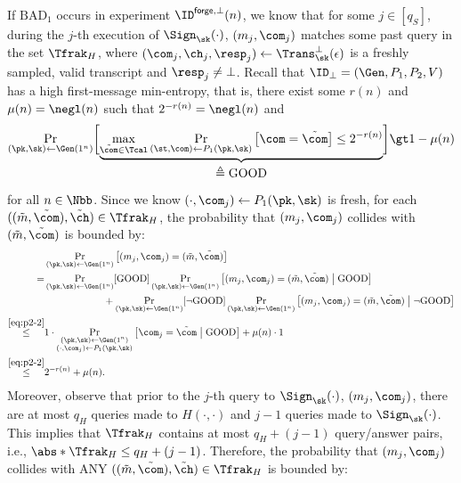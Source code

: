 \begin{answer}
    If $\textrm{BAD}_1$ occurs in experiment $\ID^{\mathsf{forge},\bot}(n)$, we know that for some $j\in [q_S]$, during the $j$-th execution of $\Sign_\sk(\cdot)$, $(m_j,\com_j)$ matches some past query in the set $\Tfrak_H$, where $(\com_j, \ch_j, \resp_j)\gets \Trans_\sk^\bot(\epsilon)$ is a freshly sampled, valid transcript and $\resp_j\neq \bot$. Recall that $\ID_\bot=(\Gen, P_1, P_2, V)$ has a high first-message min-entropy, that is, there exist some $r(n)$ and $\mu(n)=\negl(n)$ such that $2^{-r(n)}=\negl(n)$ and 
    \begin{equation}\label{eq:p2-2}
        \Pr_{(\pk, \sk)\gets \Gen(1^n)}\biggl[\underbrace{\max_{\tilde{\com}\in \Tcal} \Pr_{(\st, \com) \gets P_1(\pk, \sk)}\left[\com=\tilde{\com}\right] \le 2^{-r(n)}}_{\begin{aligned}
            \triangleq \textrm{GOOD}
        \end{aligned}} \biggr] \gt 1-\mu(n)
    \end{equation}
    for all $n\in\Nbb$. Since we know $(\cdot, \com_j) \gets P_1(\pk, \sk)$ is fresh, for each $((\tilde{m}, \tilde{\com}), \tilde{\ch}) \in \Tfrak_H$, the probability that $(m_j,\com_j)$ collides with $(\tilde{m}, \tilde{\com})$ is bounded by:
    \begin{align}\label{eq:p2-3}
        &\Pr_{(\pk, \sk)\gets \Gen(1^n)}\left[(m_j,\com_j)=(\tilde{m}, \tilde{\com}) \right]\notag\\
        =& \Pr_{(\pk, \sk)\gets \Gen(1^n)}[\textrm{GOOD}] \Pr_{(\pk, \sk)\gets \Gen(1^n)}\left[(m_j,\com_j)=(\tilde{m}, \tilde{\com}) \bigm\vert \textrm{GOOD}\right]\notag\\
        &\qquad\qquad\qquad +\Pr_{(\pk, \sk)\gets \Gen(1^n)}[\neg\textrm{GOOD}] \Pr_{(\pk, \sk)\gets \Gen(1^n)}\left[(m_j,\com_j)=(\tilde{m}, \tilde{\com}) \bigm\vert \neg \textrm{GOOD}\right]\notag\\
        \stackrel{\eqref{eq:p2-2}}\le& 1\cdot  \Pr_{\substack{(\pk, \sk)\gets \Gen(1^n)\\(\cdot, \com_j) \gets P_1(\pk, \sk)}}\left[\com_j = \tilde{\com}\bigm\vert \textrm{GOOD} \right] + \mu(n) \cdot 1\notag\\
        \stackrel{\eqref{eq:p2-2}}\le& 2^{-r(n)}+\mu(n).
    \end{align}
    Moreover, observe that prior to the $j$-th query to $\Sign_\sk(\cdot)$, $(m_j,\com_j)$, there are at most $q_H$ queries made to $H(\cdot, \cdot)$ and $j-1$ queries made to $\Sign_\sk(\cdot)$. This implies that $\Tfrak_H$ contains at most $q_H+(j-1)$ query/answer pairs, i.e., $\abs*{\Tfrak_H}\le q_H+(j-1)$. Therefore, the probability that $(m_j,\com_j)$ collides with ANY $((\tilde{m}, \tilde{\com}), \tilde{\ch}) \in \Tfrak_H$ is bounded by:

\end{answer}
